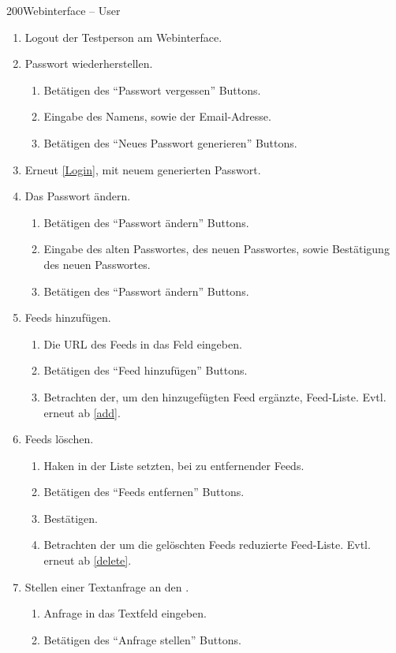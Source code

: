 \begin{testcase}{200}{Webinterface -- User}
\begin{enumerate}
  \item Logout der Testperson am Webinterface.
	\item Passwort wiederherstellen.
	\begin{enumerate}
    \item Betätigen des "`Passwort vergessen"' Buttons.
    \item Eingabe des Namens, sowie der Email-Adresse.
		\item Betätigen des "`Neues Passwort generieren"' Buttons.
  \end{enumerate}		
  \item Erneut \ref{Login}, mit neuem generierten Passwort.
	\item Das Passwort ändern.
	\begin{enumerate}
    \item Betätigen des "`Passwort ändern"' Buttons.
    \item Eingabe des alten Passwortes, des neuen Passwortes, sowie Bestätigung des neuen Passwortes.
		\item Betätigen des "`Passwort ändern"' Buttons.
  \end{enumerate}
	\item Feeds hinzufügen.
	\begin{enumerate}
    \item \label{add} Die URL des Feeds in das Feld eingeben.
    \item Betätigen des "`Feed hinzufügen"' Buttons.
    \item Betrachten der, um den hinzugefügten Feed ergänzte, Feed-Liste. Evtl. erneut ab \ref{add}.
	\end{enumerate}
	\item Feeds löschen.
	\begin{enumerate}
    \item \label{delete} Haken in der Liste setzten, bei zu entfernender Feeds.
		\item Betätigen des "`Feeds entfernen"' Buttons.
		\item Bestätigen.
    \item Betrachten der um die gelöschten Feeds reduzierte Feed-Liste. Evtl. erneut ab \ref{delete}.
	\end{enumerate}
  \item Stellen einer Textanfrage an den \NewsGenie.
	\begin{enumerate}
	  \item \label{search} Anfrage in das Textfeld eingeben.
		\item Betätigen des "`Anfrage stellen"' Buttons.

\end{enumerate}
\end{enumerate}
\end{testcase}

